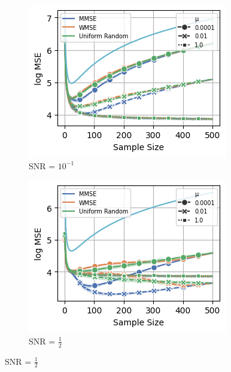 \begin{figure}%
    \centering
    \begin{subfigure}{0.3\columnwidth}
    \includegraphics[width=\columnwidth]{figures/proj1/plots/GLR_MSE/SBM_500_bandwidth_50_SNRdbs_-10.0_samps_500_mus_0.0001_0.01_1_full_band.png}
    \caption{SNR = $10^{-1}$}
    \label{GLR_SBM_MSE_subfiga}
    \end{subfigure}\hfill
    \begin{subfigure}{0.3\columnwidth}
    \includegraphics[width=\columnwidth]{figures/proj1/plots/GLR_MSE/SBM_500_bandwidth_50_SNRdbs_-3.01_samps_500_mus_0.0001_0.01_1_full_band.png}
    \caption{SNR = $\frac{1}{2}$}%
    \label{GLR_SBM_MSE_subfigb}%

\end{subfigure}
\end{figure}
